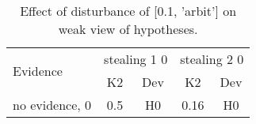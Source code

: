 \begin{table}\begin{tabular}{l|cc|cc}\toprule\multirow{2}{*}{Evidence} & \multicolumn{2}{c}{stealing 1 0}& \multicolumn{2}{c}{stealing 2 0}\\& {K2} & {Dev}& {K2} & {Dev}\\\midrule
no evidence, 0 & \cellcolor{Bittersweet}0.5&\cellcolor{Bittersweet}H0&\cellcolor{Bittersweet}0.16&\cellcolor{Bittersweet}H0\\\bottomrule\end{tabular}\caption{Effect of disturbance of [0.1, 'arbit'] on weak view of hypotheses.}\end{table}